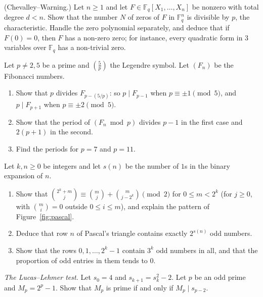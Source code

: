 \begin{exercise}[$\star\star\star$]\label{ex:chevalley}
(Chevalley--Warning.) Let $n\ge1$ and let $F\in\mathbb F_q[X_1,\dots,X_n]$ be nonzero with total degree $d<n$. Show that the number $N$ of zeros of $F$ in $\mathbb F_q^n$ is divisible by $p$, the characteristic. Handle the zero polynomial separately, and deduce that if $F(0)=0$, then $F$ has a non-zero zero; for instance, every quadratic form in $3$ variables over $\mathbb F_q$ has a non-trivial zero.
\end{exercise}

\begin{exercise}[$\star\star$]\label{pb:fibmodp}
Let $p\ne2,5$ be a prime and $\left(\frac5p\right)$ the Legendre symbol. Let $(F_n)$ be the Fibonacci numbers.
\begin{enumerate}[label=(\alph*)]
\item Show that $p$ divides $F_{p-(5/p)}$: so $p\mid F_{p-1}$ when $p\equiv\pm1\pmod5$, and $p\mid F_{p+1}$ when
$p\equiv\pm2\pmod5$.
\item Show that the period of $(F_n\bmod p)$ divides $p-1$ in the first case and $2(p+1)$ in the second.
\item Find the periods for $p=7$ and $p=11$.
\end{enumerate}
\end{exercise}

\begin{exercise}[$\star$]\label{pb:pascal2}
Let $k,n\ge0$ be integers and let $s(n)$ be the number of $1$s in the binary expansion of $n$.
\begin{enumerate}[label=(\alph*)]
\item Show that $\binom{2^k+m}j\equiv\binom mj+\binom m{j-2^k}\pmod2$ for $0\le m<2^k$ (for $j\ge0$, with $\binom mi=0$ outside $0\le i\le m$),
and explain the pattern of Figure~\ref{fig:pascal}.
\item Deduce that row $n$ of Pascal's triangle contains exactly $2^{s(n)}$ odd numbers.
\item Show that the rows $0,1,\dots,2^k-1$ contain $3^k$ odd numbers in all, and that the proportion of odd entries in them
tends to $0$.
\end{enumerate}
\end{exercise}

\begin{exercise}[$\star\star\star$]\label{pb:lucaslehmer}
\emph{The Lucas--Lehmer test.} Let $s_0=4$ and $s_{k+1}=s_k^2-2$. Let $p$ be an odd prime and $M_p=2^p-1$. Show that $M_p$
is prime if and only if $M_p\mid s_{p-2}$.
\end{exercise}

